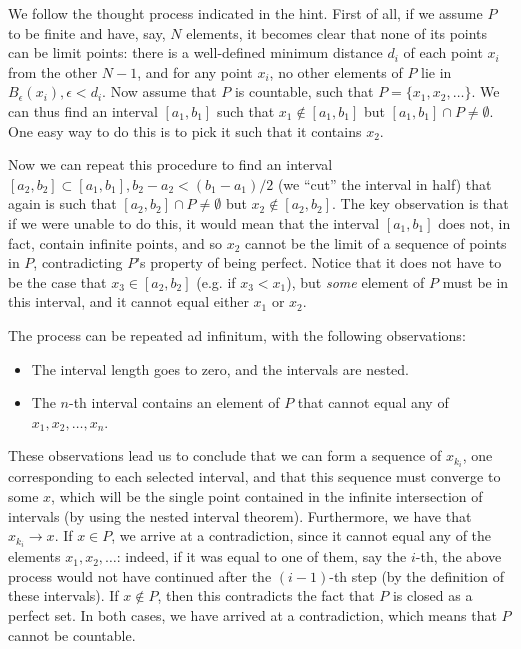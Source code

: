 \begin{solution}
    
    We follow the thought process indicated in the hint.
    First of all, if we assume $P$ to be finite and have, say, $N$ elements, it becomes clear that none of its points can be limit points: there is a well-defined minimum distance $d_i$ of each point $x_i$ from the other $N - 1$, and for any point $x_i$, no other elements of $P$ lie in $B_\epsilon(x_i), \epsilon < d_i$.
    Now assume that $P$ is countable, such that $P = \{x_1, x_2, \ldots\}$.
    We can thus find an interval $[a_1, b_1]$ such that $x_1 \notin [a_1, b_1]$ but $[a_1, b_1] \cap P \neq \emptyset$.
    One easy way to do this is to pick it such that it contains $x_2$.
    
    Now we can repeat this procedure to find an interval $[a_2, b_2] \subset [a_1, b_1], b_2 - a_2 < (b_1 - a_1)/2$ (we ``cut'' the interval in half) that again is such that $[a_2, b_2] \cap P \neq \emptyset$ but $x_2 \notin [a_2, b_2]$.
    The key observation is that if we were unable to do this, it would mean that the interval $[a_1, b_1]$ does not, in fact, contain infinite points, and so $x_2$ cannot be the limit of a sequence of points in $P$, contradicting $P$'s property of being perfect.
    Notice that it does not have to be the case that $x_3 \in [a_2, b_2]$ (e.g. if $x_3 < x_1$), but \textit{some} element of $P$ must be in this interval, and it cannot equal either $x_1$ or $x_2$.

    The process can be repeated ad infinitum, with the following observations:
    \begin{itemize}
        \item The interval length goes to zero, and the intervals are nested.
        \item The $n$-th interval contains an element of $P$ that cannot equal any of $x_1, x_2, \ldots, x_n$.
    \end{itemize}
    These observations lead us to conclude that we can form a sequence of $x_{k_i}$, one corresponding to each selected interval, and that this sequence must converge to some $x$, which will be the single point contained in the infinite intersection of intervals (by using the nested interval theorem).
    Furthermore, we have that $x_{k_i} \rightarrow x$.
    If $x \in P$, we arrive at a contradiction, since it cannot equal any of the elements $x_1, x_2, \ldots$: indeed, if it was equal to one of them, say the $i$-th, the above process would not have continued after the $(i-1)$-th step (by the definition of these intervals).
    If $x \notin P$, then this contradicts the fact that $P$ is closed as a perfect set.
    In both cases, we have arrived at a contradiction, which means that $P$ cannot be countable.
\end{solution}

